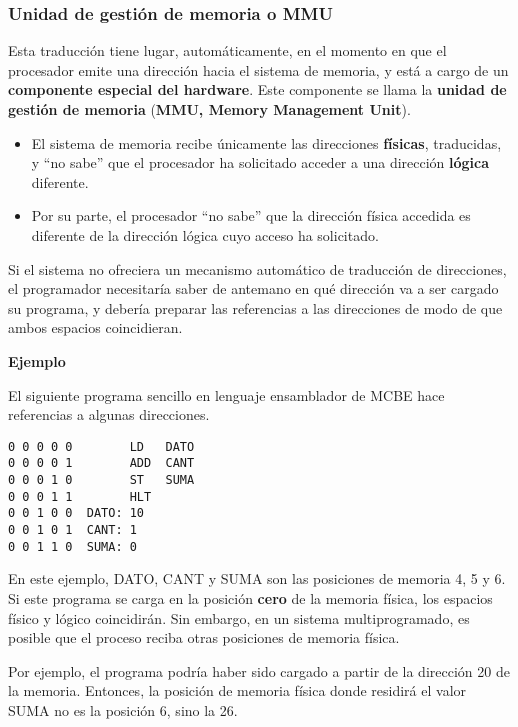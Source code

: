 \documentclass[spanish,A4,]{article}
\begin{document}
\subsubsection{Unidad de gestión de memoria o
MMU}\label{unidad-de-gestiuxf3n-de-memoria-o-mmu}

Esta traducción tiene lugar, automáticamente, en el momento en que el
procesador emite una dirección hacia el sistema de memoria, y está a
cargo de un \textbf{componente especial del hardware}. Este componente
se llama la \textbf{unidad de gestión de memoria} (\textbf{MMU, Memory
Management Unit}).

\begin{itemize}
\itemsep1pt\parskip0pt
\item
  El sistema de memoria recibe únicamente las direcciones
  \textbf{físicas}, traducidas, y ``no sabe'' que el procesador ha
  solicitado acceder a una dirección \textbf{lógica} diferente.
\item
  Por su parte, el procesador ``no sabe'' que la dirección física
  accedida es diferente de la dirección lógica cuyo acceso ha
  solicitado.
\end{itemize}

Si el sistema no ofreciera un mecanismo automático de traducción de
direcciones, el programador necesitaría saber de antemano en qué
dirección va a ser cargado su programa, y debería preparar las
referencias a las direcciones de modo de que ambos espacios
coincidieran.

\textbf{Ejemplo}

El siguiente programa sencillo en lenguaje ensamblador de MCBE hace
referencias a algunas direcciones.

\begin{verbatim}
0 0 0 0 0        LD   DATO
0 0 0 0 1        ADD  CANT
0 0 0 1 0        ST   SUMA
0 0 0 1 1        HLT
0 0 1 0 0  DATO: 10
0 0 1 0 1  CANT: 1
0 0 1 1 0  SUMA: 0
\end{verbatim}

En este ejemplo, DATO, CANT y SUMA son las posiciones de memoria 4, 5 y
6. Si este programa se carga en la posición \textbf{cero} de la memoria
física, los espacios físico y lógico coincidirán. Sin embargo, en un
sistema multiprogramado, es posible que el proceso reciba otras
posiciones de memoria física.

Por ejemplo, el programa podría haber sido cargado a partir de la
dirección 20 de la memoria. Entonces, la posición de memoria física
donde residirá el valor SUMA no es la posición 6, sino la 26.
\end{document}
